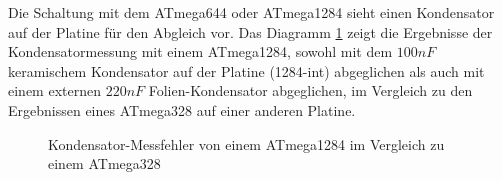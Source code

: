 Die Schaltung mit dem ATmega644 oder ATmega1284 sieht einen Kondensator auf der Platine für den Abgleich
vor. Das Diagramm \ref{fig:Mega1284} zeigt die Ergebnisse der Kondensatormessung mit einem ATmega1284,
sowohl mit dem \(100nF\) keramischem Kondensator auf der Platine (1284-int) abgeglichen als auch mit
einem externen \(220nF\) Folien-Kondensator abgeglichen, im Vergleich zu den Ergebnissen eines ATmega328 auf einer
anderen Platine.

\begin{figure}[H]
\centering

\caption{Kondensator-Messfehler von einem ATmega1284 im Vergleich zu einem ATmega328}
\label{fig:Mega1284}
\end{figure}
